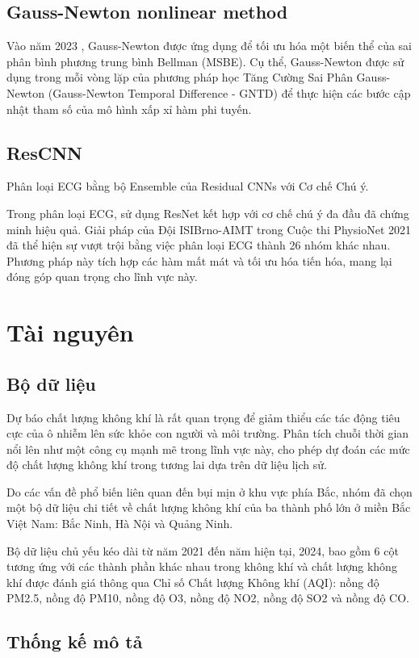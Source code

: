 \documentclass[conference]{IEEEtran}
\begin{document}
\subsection{Gauss-Newton nonlinear method}

Vào năm 2023 , Gauss-Newton được ứng dụng để tối ưu hóa một biến thể của sai phân bình phương trung bình Bellman (MSBE). Cụ thể, Gauss-Newton được sử dụng trong mỗi vòng lặp của phương pháp học Tăng Cường Sai Phân Gauss-Newton (Gauss-Newton Temporal Difference - GNTD) để thực hiện các bước cập nhật tham số của mô hình xấp xỉ hàm phi tuyến.\cite{b1}

\subsection{ResCNN}
Phân loại ECG bằng bộ Ensemble của Residual CNNs với Cơ chế Chú ý.

Trong phân loại ECG, sử dụng ResNet kết hợp với cơ chế chú ý đa đầu đã chứng minh hiệu quả. Giải pháp của Đội ISIBrno-AIMT trong Cuộc thi PhysioNet 2021 đã thể hiện sự vượt trội bằng việc phân loại ECG thành 26 nhóm khác nhau. Phương pháp này tích hợp các hàm mất mát và tối ưu hóa tiến hóa, mang lại đóng góp quan trọng cho lĩnh vực này. \cite{b4}

\section{Tài nguyên}
\subsection{Bộ dữ liệu}
Dự báo chất lượng không khí là rất quan trọng để giảm thiểu các tác động tiêu cực của ô nhiễm lên sức khỏe con người và môi trường. Phân tích chuỗi thời gian nổi lên như một công cụ mạnh mẽ trong lĩnh vực này, cho phép dự đoán các mức độ chất lượng không khí trong tương lai dựa trên dữ liệu lịch sử.

Do các vấn đề phổ biến liên quan đến bụi mịn ở khu vực phía Bắc, nhóm đã chọn một bộ dữ liệu chi tiết về chất lượng không khí của ba thành phố lớn ở miền Bắc Việt Nam: Bắc Ninh, Hà Nội và Quảng Ninh.

Bộ dữ liệu chủ yếu kéo dài từ năm 2021 đến năm hiện tại, 2024, bao gồm 6 cột tương ứng với các thành phần khác nhau trong không khí và chất lượng không khí được đánh giá thông qua Chỉ số Chất lượng Không khí (AQI): nồng độ PM2.5, nồng độ PM10, nồng độ O3, nồng độ NO2, nồng độ SO2 và nồng độ CO.
\subsection{Thống kế mô tả}
\end{document}
